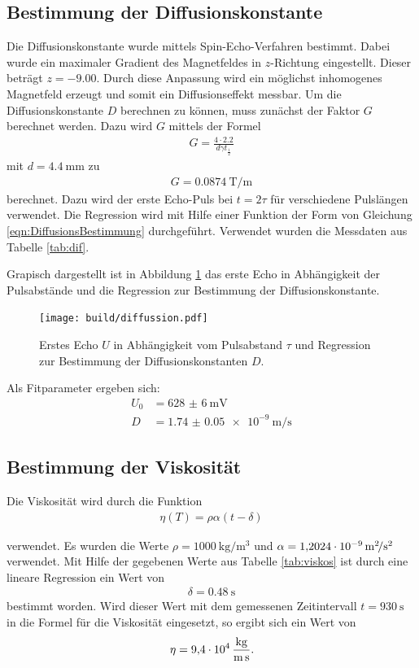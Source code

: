 \subsection{Bestimmung der Diffusionskonstante}
Die Diffusionskonstante wurde mittels Spin-Echo-Verfahren bestimmt. Dabei wurde
ein maximaler Gradient des Magnetfeldes in $z$-Richtung eingestellt. Dieser beträgt
$z = -\num{9.00}$. Durch diese Anpassung wird ein möglichst inhomogenes Magnetfeld
erzeugt und somit ein Diffusionseffekt messbar.
Um die Diffusionskonstante $D$ berechnen zu können, muss zunächst der Faktor
$G$ berechnet werden. Dazu wird $G$ mittels der Formel
\begin{align*}
  G = \frac{4\cdot 2.2}{d \gamma t_\frac{1}{2}}
\end{align*}
mit $d = \SI{4.4}{\milli\meter}$ zu
\begin{align*}
  G = \SI{0.0874}{\tesla\per\meter}
\end{align*}
berechnet.
Dazu wird der erste Echo-Puls bei $t = 2\tau$ für verschiedene Pulslängen
verwendet. Die Regression wird mit Hilfe
einer Funktion der Form von Gleichung \eqref{eqn:DiffusionsBestimmung} durchgeführt. Verwendet wurden die
Messdaten aus Tabelle \ref{tab:dif}.

Grapisch dargestellt ist in Abbildung
\ref{plt:diff} das erste Echo in Abhängigkeit der Pulsabstände und die Regression
zur Bestimmung der Diffusionskonstante.
\begin{figure}[htb]
  \centering
  \texttt{[image: build/diffussion.pdf]}
  \caption{Erstes Echo $U$ in Abhängigkeit vom Pulsabstand $\tau$ und Regression
  zur Bestimmung der Diffusionskonstanten $D$.}
  \label{plt:diff}
\end{figure}
Als Fitparameter ergeben sich:
\begin{align*}
  U_0 &= \SI{628(6)}{\milli\volt} \\
  D &= \SI{1.74(5)e-9}{\meter\per\second}
\end{align*}

\subsection{Bestimmung der Viskosität}
Die Viskosität wird durch die Funktion
\begin{align*}
  \eta(T) = \rho \alpha \left(t - \delta\right)
\end{align*}

verwendet. Es wurden die Werte $\rho = \SI{1000}{\kilo\gram\per\cubic\meter}$
und $\alpha = \SI{1.2024d-9}{\square\meter\per\square\second}$ verwendet. Mit
Hilfe der gegebenen Werte aus Tabelle \ref{tab:viskos} ist durch eine lineare
Regression ein Wert von
\begin{align*}
  \delta = \SI{0.48}{\second}
\end{align*}
bestimmt worden. Wird dieser Wert mit dem gemessenen Zeitintervall
$t = \SI{930}{\second}$ in die Formel für die Viskosität eingesetzt,
so ergibt sich ein Wert von
\begin{align*}
  \eta = \SI{9.4d4}{\kilo\gram\per\meter\per\second}.
\end{align*}

